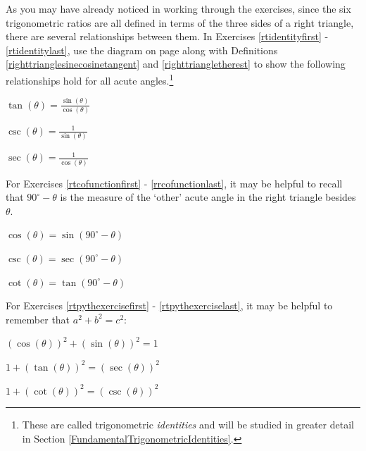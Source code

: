 \documentclass{ximera}
\begin{document}
\begin{question}
As you may have already noticed in working through the exercises, since the six trigonometric ratios are all defined in terms of the three sides of a right triangle, there are several relationships between them.  In Exercises \ref{rtidentityfirst} - \ref{rtidentitylast}, use the diagram on page \pageref{righttranglediagram} along with Definitions \ref{righttrianglesinecosinetangent} and \ref{righttriangletherest} to show the following relationships hold for all acute angles.\footnote{These are called trigonometric \textit{identities} and will be studied in greater detail in Section \ref{FundamentalTrigonometricIdentities}.}

\begin{problem} \label{rtidentityfirst}
$\tan(\theta) = \frac{\sin(\theta)}{\cos(\theta)}$ 
\end{problem}

\begin{problem}
$\csc(\theta) = \frac{1}{\sin(\theta)}$
\end{problem}

\begin{problem}
$\sec(\theta) = \frac{1}{\cos(\theta)}$
\end{problem}



For Exercises \ref{rtcofunctionfirst} - \ref{rrcofunctionlast}, it may be helpful to recall that $90^{\circ} - \theta$ is the measure of the `other' acute angle in the right triangle besides $\theta$.

\begin{problem} \label{rtcofunctionfirst} \label{cofunctionforeshadowing}
$\cos(\theta) = \sin\left( 90^{\circ} - \theta \right) $ 
\end{problem}

\begin{problem}
$\csc(\theta) = \sec\left( 90^{\circ} - \theta \right) $
\end{problem}

\begin{problem} \label{rrcofunctionlast}
$\cot(\theta) = \tan\left( 90^{\circ} - \theta \right) $ 
\end{problem}


For Exercises \ref{rtpythexercisefirst} - \ref{rtpythexerciselast}, it may be helpful to remember that $a^2+b^2 = c^2$:

\begin{problem} \label{rtpythexercisefirst}
$(\cos(\theta))^2 + (\sin(\theta))^2 = 1$ 
\end{problem}

\begin{problem}
$1 + (\tan(\theta))^2 = (\sec(\theta))^2$
\end{problem}

\begin{problem} \label{rtpythexerciselast} \label{rtidentitylast}
$ 1 + (\cot(\theta))^2 = (\csc(\theta))^2$ 

\end{problem}

\end{question}
\end{document}

